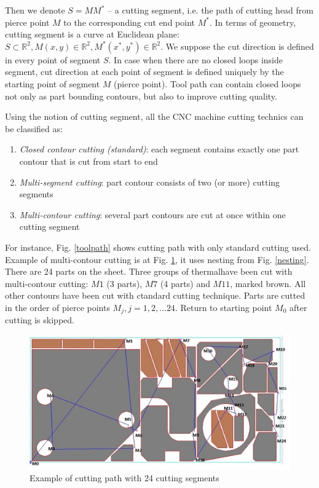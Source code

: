 \documentclass{../download/tPRS2e}
\begin{document}
Then we denote $S=MM^*$ -- a cutting segment,
i.e. the path of cutting head
from pierce point $M$
to the corresponding cut end point $M^*$.
In terms of geometry,
cutting segment is a curve at Euclidean plane:
$S \subset \mathbb R^2,
M(x,y) \in \mathbb R^2,
M^*(x^*,y^*) \in \mathbb R^2$.
We suppose
the cut direction is defined
in every point of segment $S$.
In case when there are no
closed loops inside segment,
cut direction at each point of segment
is defined uniquely by the starting
point of segment $M$
(pierce point).
Tool path can contain closed loops
not only as part bounding contours,
but also to improve cutting quality.

Using the notion of cutting segment,
all the CNC machine cutting technics
can be classified as:
\begin{enumerate}
    \item{\textit{Closed contour cutting (standard)}}:
    each segment contains exactly one part contour
    that is cut from start to end
    \item{\textit{Multi-segment cutting}}:
    part contour consists of two (or more) cutting segments
    \item{\textit{Multi-contour cutting}}:
    several part contours are cut at once within one cutting segment
\end{enumerate}

For instance, Fig. \ref{toolpath}
shows cutting path with only
standard cutting used.
Example of multi-contour cutting is at
Fig. \ref{cutting},
it uses nesting from Fig. \ref{nesting}.
There are 24 parts on the sheet.
Three groups of thermalhave been cut with multi-contour cutting:
$M1$ (3 parts),
$M7$ (4 parts) and
$M11$,
marked brown.
All other contours have been cut
with ctandard cutting technique.
Parts are cutted in the order of
pierce points $M_j, j=1, 2, \dots 24$.
Return to starting point $M_0$
after cutting is skipped.

\begin{figure}[h]
    \begin{center}
    \includegraphics{cutting.png}
    \caption{Example of cutting path with 24 cutting segments} \label{cutting}
    \end{center}
\end{figure}
\end{document}
